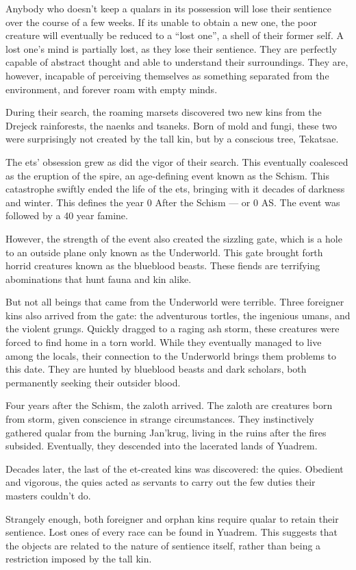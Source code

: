 Anybody who doesn't keep a qualars in its possession will lose their sentience over the course of a few weeks.
If its unable to obtain a new one, the poor creature will eventually be reduced to a ``lost one'', a shell of their former self.
A lost one's mind is partially lost, as they lose their sentience.
They are perfectly capable of abstract thought and able to understand their surroundings.
They are, however, incapable of perceiving themselves as something separated from the environment, and forever roam with empty minds.

During their search, the roaming marsets discovered two new kins from the Drejeck rainforests, the naenks and tsaneks.
Born of mold and fungi, these two were surprisingly not created by the tall kin, but by a conscious tree, Tekatsae.

The ets' obsession grew as did the vigor of their search.
This eventually coalesced as the eruption of the spire, an age-defining event known as the Schism.
This catastrophe swiftly ended the life of the ets, bringing with it decades of darkness and winter.
This defines the year 0 After the Schism --- or 0 AS.
The event was followed by a 40 year famine.

However, the strength of the event also created the sizzling gate, which is a hole to an outside plane only known as the Underworld.
This gate brought forth horrid creatures known as the blueblood beasts.
These fiends are terrifying abominations that hunt fauna and kin alike.

But not all beings that came from the Underworld were terrible.
Three foreigner kins also arrived from the gate: the adventurous tortles, the ingenious umans, and the violent grungs.
Quickly dragged to a raging ash storm, these creatures were forced to find home in a torn world.
While they eventually managed to live among the locals, their connection to the Underworld brings them problems to this date.
They are hunted by blueblood beasts and dark scholars, both permanently seeking their outsider blood.

Four years after the Schism, the zaloth arrived.
The zaloth are creatures born from storm, given conscience in strange circumstances.
They instinctively gathered qualar from the burning Jan'krug, living in the ruins after the fires subsided.
Eventually, they descended into the lacerated lands of Yuadrem.

Decades later, the last of the et-created kins was discovered: the quies.
Obedient and vigorous, the quies acted as servants to carry out the few duties their masters couldn't do.

Strangely enough, both foreigner and orphan kins require qualar to retain their sentience.
Lost ones of every race can be found in Yuadrem.
This suggests that the objects are related to the nature of sentience itself, rather than being a restriction imposed by the tall kin.







